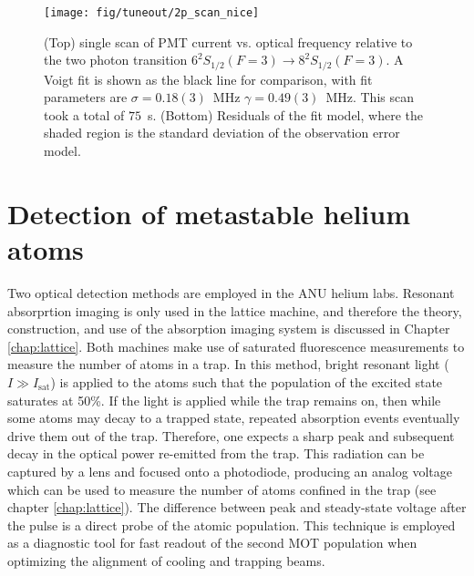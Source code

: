 {	%


	\begin{figure}
	    \centering
	    \texttt{[image: fig/tuneout/2p\_scan\_nice]}
	    \caption{(Top) single scan of PMT current vs. optical frequency relative to the two photon transition $6^{2}S_{1/2} (F=3) \rightarrow 8^{2}S_{1/2} (F=3)$. A Voigt fit is shown as the black line for comparison, with fit parameters are $\sigma=0.18(3)$~MHz $\gamma=0.49(3)$~MHz. This scan took a total of \(75\)~s. (Bottom) Residuals of the fit model, where the shaded region is the standard deviation of the observation error model. 
	    }
	    \label{fig:2p_scan_single}
	\end{figure}}

\section{Detection of metastable helium atoms}
\label{sec:he_detection}
	Two optical detection methods are employed in the ANU helium labs.
	Resonant absorprtion imaging is only used in the lattice machine, and therefore the theory, construction, and use of the absorption imaging system is discussed in Chapter \ref{chap:lattice}.
	Both machines make use of saturated fluorescence measurements to measure the number of atoms in a trap.
	In this method, bright resonant light ($I\gg I_\textrm{sat}$) is applied to the atoms such that the population of the excited state saturates at 50\%.
	If the light is applied while the trap remains on, then while some atoms may decay to a trapped state, repeated absorption events eventually drive them out of the trap.
	Therefore, one expects a sharp peak and subsequent decay in the optical power re-emitted from the trap.
	This radiation can be captured by a lens and focused onto a photodiode, producing an analog voltage which can be used to measure the number of atoms confined in the trap (see chapter \ref{chap:lattice}).
	The difference between peak and steady-state voltage after the pulse is a direct probe of the atomic population.
	This technique is employed as a diagnostic tool for fast readout of the second MOT population when optimizing the alignment of cooling and trapping beams. 

